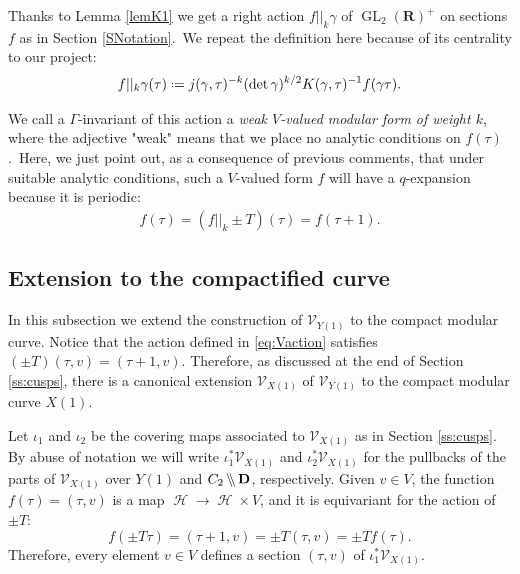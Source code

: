 \documentclass[12pt]{amsart}
\theoremstyle{plain}
\theoremstyle{definition}
\theoremstyle{remark}
\newcommand{\cV}{\mathcal{V}}
\newcommand{\bD}{\mathbf{D}}
\DeclareMathOperator{\uhp}{\mathcal{H}}
\DeclareMathOperator{\GL}{GL}
\newcommand*{\df}{\mathrel{\vcenter{\baselineskip0.5ex \lineskiplimit0pt
                     \hbox{\scriptsize.}\hbox{\scriptsize.}}} =}
\newcommand{\RR}{\mathbf{R}}
\DeclareMathOperator{\obackslash}{\backslash\hspace{-3pt}\backslash}
\begin{document}
Thanks to Lemma \ref{lemK1} we get a right action $f||_k\gamma$ of $\GL_2(\RR)^+$ on sections $f$ as in Section \ref{SNotation}.\ We repeat the definition here because of its centrality to our project: 
\begin{eqnarray}\label{fKact}
    f||_k\gamma(\tau)\df j(\gamma, \tau)^{-k}(\det\gamma)^{k/2}K(\gamma, \tau)^{-1}f(\gamma\tau).
    \end{eqnarray}

 \medskip
 We  call a $\Gamma$-invariant of this action a \textit{weak $V$-valued modular form of weight $k$}, where the adjective "weak" means that we place no analytic conditions on $f(\tau)$.\ 
Here, we just point out, as a consequence of previous comments, that under suitable analytic conditions, such a $V$-valued form $f$ will have a $q$-expansion because it is periodic:
\begin{eqnarray}\label{Tact}
f(\tau)=(f||_k \pm T)(\tau)=f(\tau+1).
\end{eqnarray}
\subsection{Extension to the compactified curve}
\label{ss:cusp}
In this subsection we extend the construction of $\cV_{Y(1)}$ to the compact modular curve. Notice that the action defined in \eqref{eq:Vaction} satisfies $(\pm T)(\tau,v) = (\tau+1,v)$. Therefore, as discussed at the end of Section \ref{ss:cusps}, there is a canonical extension $\cV_{X(1)}$ of $\cV_{Y(1)}$ to the compact modular curve $X(1)$. 

\medskip
Let $\iota_1$ and $\iota_2$ be the covering maps associated to $\cV_{X(1)}$ as in Section \ref{ss:cusps}. By abuse of notation we will write $\iota_1^*\cV_{X(1)}$ and $\iota_2^*\cV_{X(1)}$ for the pullbacks of the parts of $\cV_{X(1)}$ over $Y(1)$ and $C_2\obackslash \bD$, respectively. Given $v \in V$, the function $f(\tau) = (\tau,v)$ is a map $\uhp \to \uhp\times V$, and it is equivariant for the action of $\pm T$:
\[
f(\pm T\tau) = (\tau+1,v) = \pm T(\tau,v) = \pm Tf(\tau).
\]
Therefore, every element $v\in V$ defines a section $(\tau,v)$ of $\iota_1^*\cV_{X(1)}$.
\end{document}
